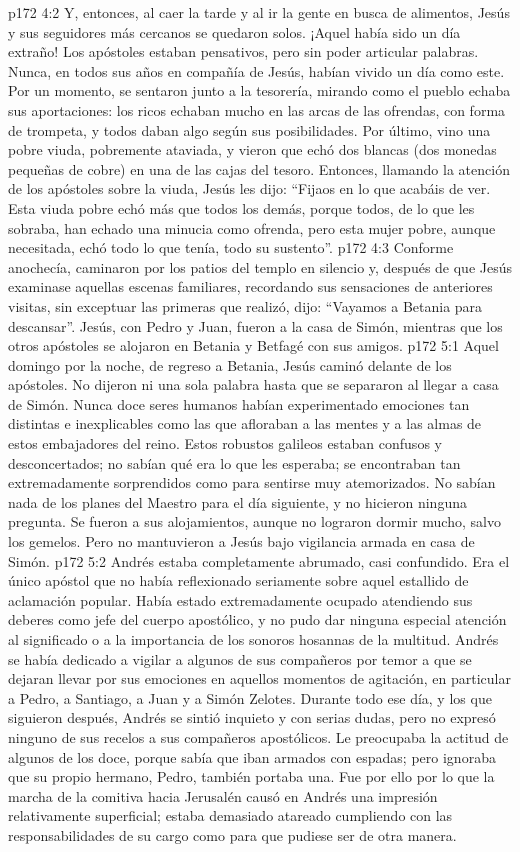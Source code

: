 \vs p172 4:2 Y, entonces, al caer la tarde y al ir la gente en busca de alimentos, Jesús y sus seguidores más cercanos se quedaron solos. ¡Aquel había sido un día extraño! Los apóstoles estaban pensativos, pero sin poder articular palabras. Nunca, en todos sus años en compañía de Jesús, habían vivido un día como este. Por un momento, se sentaron junto a la tesorería, mirando como el pueblo echaba sus aportaciones: los ricos echaban mucho en las arcas de las ofrendas, con forma de trompeta, y todos daban algo según sus posibilidades. Por último, vino una pobre viuda, pobremente ataviada, y vieron que echó dos blancas (dos monedas pequeñas de cobre) en una de las cajas del tesoro. Entonces, llamando la atención de los apóstoles sobre la viuda, Jesús les dijo: “Fijaos en lo que acabáis de ver. Esta viuda pobre echó más que todos los demás, porque todos, de lo que les sobraba, han echado una minucia como ofrenda, pero esta mujer pobre, aunque necesitada, echó todo lo que tenía, todo su sustento”.
\vs p172 4:3 Conforme anochecía, caminaron por los patios del templo en silencio y, después de que Jesús examinase aquellas escenas familiares, recordando sus sensaciones de anteriores visitas, sin exceptuar las primeras que realizó, dijo: “Vayamos a Betania para descansar”. Jesús, con Pedro y Juan, fueron a la casa de Simón, mientras que los otros apóstoles se alojaron en Betania y Betfagé con sus amigos.
\vs p172 5:1 Aquel domingo por la noche, de regreso a Betania, Jesús caminó delante de los apóstoles. No dijeron ni una sola palabra hasta que se separaron al llegar a casa de Simón. Nunca doce seres humanos habían experimentado emociones tan distintas e inexplicables como las que afloraban a las mentes y a las almas de estos embajadores del reino. Estos robustos galileos estaban confusos y desconcertados; no sabían qué era lo que les esperaba; se encontraban tan extremadamente sorprendidos como para sentirse muy atemorizados. No sabían nada de los planes del Maestro para el día siguiente, y no hicieron ninguna pregunta. Se fueron a sus alojamientos, aunque no lograron dormir mucho, salvo los gemelos. Pero no mantuvieron a Jesús bajo vigilancia armada en casa de Simón.
\vs p172 5:2 Andrés estaba completamente abrumado, casi confundido. Era el único apóstol que no había reflexionado seriamente sobre aquel estallido de aclamación popular. Había estado extremadamente ocupado atendiendo sus deberes como jefe del cuerpo apostólico, y no pudo dar ninguna especial atención al significado o a la importancia de los sonoros hosannas de la multitud. Andrés se había dedicado a vigilar a algunos de sus compañeros por temor a que se dejaran llevar por sus emociones en aquellos momentos de agitación, en particular a Pedro, a Santiago, a Juan y a Simón Zelotes. Durante todo ese día, y los que siguieron después, Andrés se sintió inquieto y con serias dudas, pero no expresó ninguno de sus recelos a sus compañeros apostólicos. Le preocupaba la actitud de algunos de los doce, porque sabía que iban armados con espadas; pero ignoraba que su propio hermano, Pedro, también portaba una. Fue por ello por lo que la marcha de la comitiva hacia Jerusalén causó en Andrés una impresión relativamente superficial; estaba demasiado atareado cumpliendo con las responsabilidades de su cargo como para que pudiese ser de otra manera.
